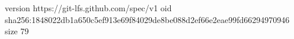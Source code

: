 version https://git-lfs.github.com/spec/v1
oid sha256:1848022db1a650c5ef913e69f84029de8be088d2ef66e2eae99fd66294970946
size 79
